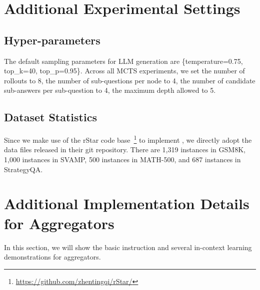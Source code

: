 
\onecolumn

\section{Additional Experimental Settings}
\label{sec:appendix:exp_setting}

\subsection{Hyper-parameters}
The default sampling parameters for LLM generation are \{temperature=0.75, top\_k=40, top\_p=0.95\}.
Across all MCTS experiments, we set the number of rollouts to 8, the number of sub-questions per node to 4, the number of candidate sub-answers per sub-question to 4, the maximum depth allowed to 5.

\subsection{Dataset Statistics}
Since we make use of the rStar code base~\footnote{\url{https://github.com/zhentingqi/rStar/}} to implement \mosa, we directly adopt the data files released in their git repository.
There are 1,319 instances in GSM8K, 1,000 instances in SVAMP, 500 instances in MATH-500, and 687 instances in StrategyQA.

\section{Additional Implementation Details for Aggregators}
\label{sec:appendix:prompt}

In this section, we will show the basic instruction and several in-context learning demonstrations for aggregators.




